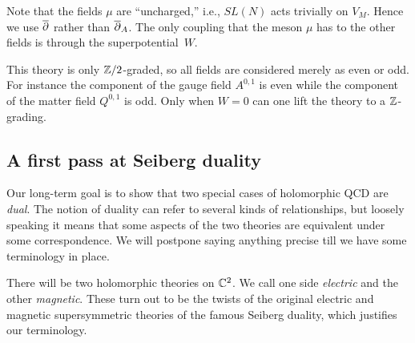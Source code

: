 \documentclass[11pt]{amsart}
\def\SU{{\rm SU}}
\begin{document}
Note that the fields $\mu$ are ``uncharged,'' i.e., $SL(N)$ acts trivially on $V_M$.
Hence we use ${\overline{\partial}}$ rather than ${\overline{\partial}}_A$.
The only coupling that the meson $\mu$ has to the other fields is through the superpotential~$W$. 

\begin{rmk}
This theory is only $\mathbb Z/2$-graded, so all fields are considered merely as even or odd.
For instance the component of the gauge field $A^{0,1}$ is even while the component of the matter field $Q^{0,1}$ is odd. 
Only when $W = 0$ can one lift the theory to a $\mathbb Z$-grading.
\end{rmk}

\subsection{A first pass at Seiberg duality}

Our long-term goal is to show that two special cases of holomorphic QCD are {\em dual}.
The notion of duality can refer to several kinds of relationships,
but loosely speaking it means that some aspects of the two theories are equivalent under some correspondence.
We will postpone saying anything precise till we have some terminology in place.


There will be two holomorphic theories on $\mathbb C^2$. 
We call one side {\em electric} and the other {\em magnetic}.
These turn out to be the twists of the original electric and magnetic supersymmetric theories of the famous Seiberg duality, which justifies our terminology.
\end{document}
